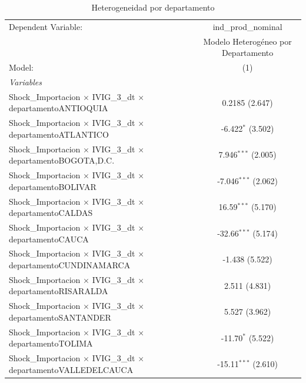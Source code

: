 \documentclass[12pt]{article}
\begin{document}
\setcounter{table}{10}
\begin{table}[htbp]
\centering
\begin{threeparttable}

   \caption{Heterogeneidad por departamento}
   \centering
   \small
   \begin{tabular}{lc}
      \tabularnewline \midrule \midrule
      Dependent Variable:                                                             & ind\_prod\_nominal\\    
                                                                                      & Modelo Heterogéneo por Departamento \\   
      Model:                                                                          & (1)\\  
      \midrule
      \emph{Variables}\\
      Shock\_Importacion $\times$ IVIG\_3\_dt $\times$ departamentoANTIOQUIA          & 0.2185 (2.647)\\   
      Shock\_Importacion $\times$ IVIG\_3\_dt $\times$ departamentoATLANTICO          & -6.422$^{*}$ (3.502)\\   
      Shock\_Importacion $\times$ IVIG\_3\_dt $\times$ departamentoBOGOTA,D.C.        & 7.946$^{***}$ (2.005)\\   
      Shock\_Importacion $\times$ IVIG\_3\_dt $\times$ departamentoBOLIVAR            & -7.046$^{***}$ (2.062)\\   
      Shock\_Importacion $\times$ IVIG\_3\_dt $\times$ departamentoCALDAS             & 16.59$^{***}$ (5.170)\\   
      Shock\_Importacion $\times$ IVIG\_3\_dt $\times$ departamentoCAUCA              & -32.66$^{***}$ (5.174)\\   
      Shock\_Importacion $\times$ IVIG\_3\_dt $\times$ departamentoCUNDINAMARCA       & -1.438 (5.522)\\   
      Shock\_Importacion $\times$ IVIG\_3\_dt $\times$ departamentoRISARALDA          & 2.511 (4.831)\\   
      Shock\_Importacion $\times$ IVIG\_3\_dt $\times$ departamentoSANTANDER          & 5.527 (3.962)\\   
      Shock\_Importacion $\times$ IVIG\_3\_dt $\times$ departamentoTOLIMA             & -11.70$^{*}$ (5.522)\\   
      Shock\_Importacion $\times$ IVIG\_3\_dt $\times$ departamentoVALLEDELCAUCA      & -15.11$^{***}$ (2.610)\\   
      \midrule

\end{tabular}
\end{threeparttable}
\end{table}
\end{document}
